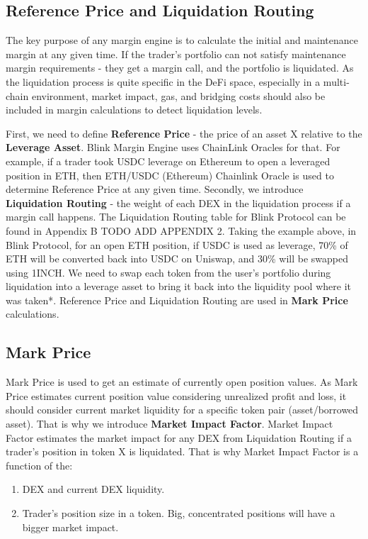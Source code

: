\documentclass[conference]{IEEEtran}
\begin{document}
\subsection{Reference Price and Liquidation Routing}
The key purpose of any margin engine is to calculate the initial and maintenance margin at any given time. If the trader's portfolio can not satisfy maintenance margin requirements -  they get a margin call, and the portfolio is liquidated. As the liquidation process is quite specific in the DeFi space, especially in a multi-chain environment, market impact, gas, and bridging costs should also be included in margin calculations to detect liquidation levels.

First, we need to define \textbf {Reference Price} - the price of an asset X relative to the \textbf{Leverage Asset}. Blink Margin Engine uses ChainLink Oracles for that. For example, if a trader took USDC leverage on Ethereum to open a leveraged position in ETH, then ETH/USDC (Ethereum) Chainlink Oracle is used to determine Reference Price at any given time. Secondly, we introduce \textbf {Liquidation Routing} - the weight of each DEX in the liquidation process if a margin call happens. The Liquidation Routing table for Blink Protocol can be found in Appendix B TODO ADD APPENDIX 2. Taking the example above, in Blink Protocol, for an open ETH position, if USDC is used as leverage, 70\% of ETH will be converted back into USDC on Uniswap, and 30\% will be swapped using 1INCH. We need to swap each token from the user's portfolio during liquidation into a leverage asset to bring it back into the liquidity pool where it was taken*. Reference Price and Liquidation Routing are used in \textbf{Mark Price} calculations.

\thispagestyle{fancy}

\subsection{Mark Price}

Mark Price is used to get an estimate of currently open position values. As Mark Price estimates current position value considering unrealized profit and loss, it should consider current market liquidity for a specific token pair (asset/borrowed asset). That is why we introduce \textbf{Market Impact Factor}. Market Impact Factor estimates the market impact for any DEX from Liquidation Routing if a trader's position in token X is liquidated. That is why Market Impact Factor is a function of the:
  \begin{enumerate}
  \item DEX and current DEX liquidity.
  \item Trader's position size in a token. Big, concentrated positions will have a bigger market impact. 	
  \end{enumerate}
\end{document}
